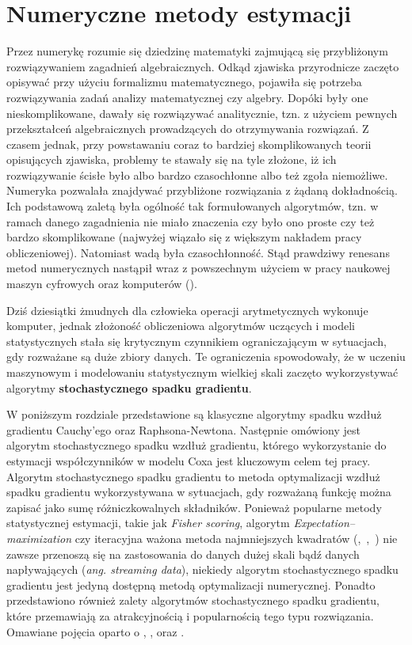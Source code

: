 \chapter{Numeryczne metody estymacji}\label{numPAJ}

Przez numerykę rozumie się dziedzinę matematyki
zajmującą się przybliżonym rozwiązywaniem zagadnień algebraicznych. Odkąd zjawiska przyrodnicze zaczęto opisywać przy użyciu formalizmu matematycznego,
pojawiła się potrzeba rozwiązywania zadań analizy matematycznej czy algebry. Dopóki były
one nieskomplikowane, dawały się rozwiązywać analitycznie, tzn. z użyciem pewnych
przekształceń algebraicznych prowadzących do otrzymywania rozwiązań. Z czasem jednak, przy powstawaniu coraz to bardziej skomplikowanych teorii
opisujących zjawiska, problemy te stawały się na tyle złożone, iż ich rozwiązywanie ścisłe
było albo bardzo czasochłonne albo też zgoła niemożliwe. Numeryka pozwalała znajdywać
przybliżone rozwiązania z żądaną dokładnością. Ich podstawową zaletą była ogólność tak
formułowanych algorytmów, tzn. w ramach danego zagadnienia nie miało znaczenia czy było
ono proste czy też bardzo skomplikowane (najwyżej wiązało się z większym nakładem pracy
obliczeniowej). Natomiast wadą była czasochłonność. Stąd prawdziwy renesans metod
numerycznych nastąpił wraz z powszechnym użyciem w pracy naukowej maszyn cyfrowych oraz komputerów (\cite{milewski}). 

Dziś dziesiątki żmudnych dla człowieka operacji
arytmetycznych wykonuje komputer, jednak złożoność obliczeniowa algorytmów uczących i modeli statystycznych stała się krytycznym czynnikiem ograniczającym w sytuacjach, gdy rozważane są duże zbiory danych. Te ograniczenia spowodowały, że w uczeniu maszynowym i modelowaniu statystycznym wielkiej skali zaczęto wykorzystywać algorytmy \textbf{stochastycznego spadku gradientu}. 

W poniższym rozdziale przedstawione są klasyczne algorytmy spadku wzdłuż gradientu Cauchy'ego oraz Raphsona-Newtona. Następnie omówiony jest algorytm stochastycznego spadku wzdłuż gradientu, którego wykorzystanie do estymacji współczynników w modelu Coxa jest kluczowym celem tej pracy. Algorytm stochastycznego spadku gradientu to metoda optymalizacji wzdłuż spadku gradientu wykorzystywana w sytuacjach, gdy rozważaną funkcję można zapisać jako sumę różniczkowalnych składników. Ponieważ popularne metody statystycznej estymacji, takie jak \textit{Fisher scoring}, algorytm \textit{Expectation–maximization} czy iteracyjna ważona metoda najmniejszych kwadratów (\cite{fisher3},~\cite{dempster},~\cite{greenPJ}) nie zawsze przenoszą się na zastosowania do danych dużej skali bądź danych napływających (\textit{ang. streaming data}), niekiedy algorytm stochastycznego spadku gradientu jest jedyną dostępną metodą optymalizacji numerycznej. Ponadto przedstawiono również zalety algorytmów stochastycznego spadku gradientu, które przemawiają za atrakcyjnością i popularnością tego typu rozwiązania. Omawiane pojęcia oparto o \cite{bott1}, \cite{bott2}, \cite{kotlowski} oraz \cite{fortuna}.

